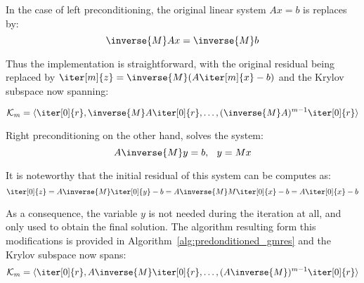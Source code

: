 \noindent In the case of left preconditioning, the original linear system $Ax=b$ is replaces by:
\begin{equation}
    \inverse{M}Ax=\inverse{M}b
\end{equation}

\noindent Thus the implementation is straightforward, with the original residual being replaced by $\iter[m]{z}=\inverse{M}(A\iter[m]{x}-b)$ and the Krylov subspace now spanning:

\begin{equation}
    \mathcal{K}_m = \langle \iter[0]{r}, \inverse{M}A\iter[0]{r}, \dots, (\inverse{M}A)^{m-1}\iter[0]{r} \rangle
\end{equation}

\noindent Right preconditioning on the other hand, solves the system:
\begin{equation}
    A\inverse{M}y=b\text{, } \;\; y=Mx
\end{equation}

\noindent It is noteworthy that the initial residual of this system can be computes as:
\begin{equation}
    \iter[0]{z} = A\inverse{M}\iter[0]{y}-b = A\inverse{M}M\iter[0]{x}-b= A\iter[0]{x}-b
\end{equation}

\noindent As a consequence, the variable $y$ is not needed during the iteration at all, and only used to obtain the final solution. The algorithm resulting form this modifications is provided in Algorithm~\hyperref[alg:predonditioned_gmres]{\ref{alg:predonditioned_gmres}} and the Krylov subspace now spans:
\begin{equation}
    \mathcal{K}_m = \langle \iter[0]{r}, A\inverse{M}\iter[0]{r}, \dots, (A\inverse{M})^{m-1}\iter[0]{r} \rangle
\end{equation}

